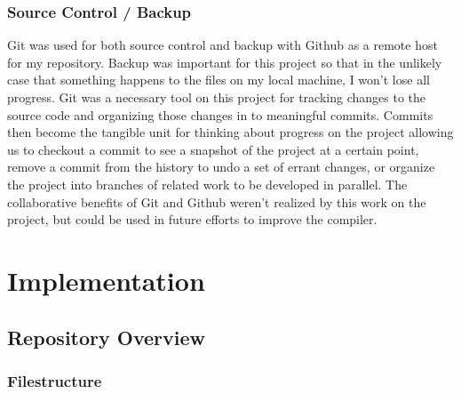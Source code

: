 \documentclass[12pt,a4paper,twoside,openright]{report}
\begin{document}
\subsection{Source Control / Backup}
Git was used for both source control and backup with Github as a remote host for my repository.
Backup was important for this project so that in the unlikely case that something happens to the files on my local machine, I won't lose all progress.
Git was a necessary tool on this project for tracking changes to the source code and organizing those changes in to meaningful commits.
Commits then become the tangible unit for thinking about progress on the project allowing us to checkout a commit to see a snapshot of the project at a certain point, remove a commit from the history to undo a set of errant changes, or organize the project into branches of related work to be developed in parallel.
The collaborative benefits of Git and Github weren't realized by this work on the project, but could be used in future efforts to improve the compiler.

\chapter{Implementation}

\section{Repository Overview}
\subsection{Filestructure}
\end{document}
